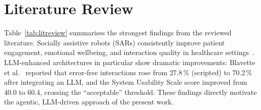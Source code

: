 \documentclass[conference]{IEEEtran}
\begin{document}
\section{Literature Review}
\label{sec:litreview}

Table~\ref{tab:litreview} summarises the strongest findings from the reviewed
literature.
Socially assistive robots (SARs) consistently improve patient engagement,
emotional wellbeing, and interaction quality in healthcare
settings~\cite{nichol2024,giansanti2025}.
LLM-enhanced architectures in particular show dramatic improvements: Blavette
et al.~\cite{blavette2025} reported that error-free interactions rose from
27.8\,\% (scripted) to 70.2\,\% after integrating an LLM, and the System
Usability Scale score improved from 40.0 to 60.4, crossing the ``acceptable''
threshold.
These findings directly motivate the agentic, LLM-driven approach of the present
work.
\end{document}
